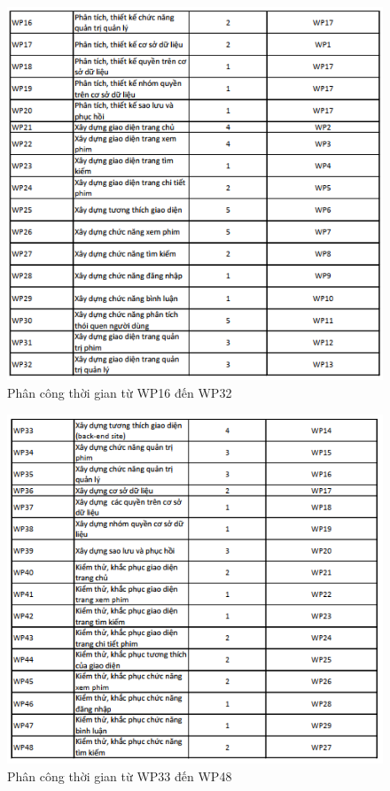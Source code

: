 \documentclass[a4paper]{book}
\begin{document}
\begin{figure}
	\centering
	\includegraphics[width=0.7\textheight]{Timing_16_32.png}
	\caption{Phân công thời gian từ WP16 đến WP32}
	\label{fig:Timing_16_32}
\end{figure}
\begin{figure}
	\centering
	\includegraphics[width=0.7\textheight]{Timing_33_48.png}
	\caption{Phân công thời gian từ WP33 đến WP48}
	\label{fig:Timing_33_48}
\end{figure}
\end{document}
